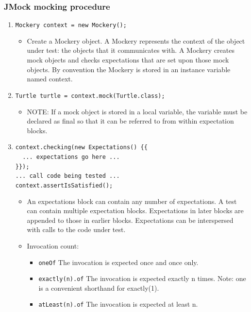 \documentclass{article}
\begin{document}
\subsubsection{JMock mocking procedure}
\begin{enumerate}
    \item \lstinline{Mockery context = new Mockery();}
        \begin{itemize}
            \item Create a Mockery object. A Mockery represents the context of the object under test: the objects that it communicates with. A Mockery creates mock objects and checks expectations that are set upon those mock objects. By convention the Mockery is stored in an instance variable named context.
        \end{itemize}
    \item \lstinline{Turtle turtle = context.mock(Turtle.class);}
        \begin{itemize}
            \item NOTE: If a mock object is stored in a local variable, the variable must be declared as final so that it can be referred to from within expectation blocks.
        \end{itemize}
    \item \lstinline|context.checking(new Expectations() {{|\\
          \lstinline|  ... expectations go here ...|\\
          \lstinline|}});|\\
          \lstinline|... call code being tested ...|\\
          \lstinline|context.assertIsSatisfied();|
        \begin{itemize}
            \item An expectations block can contain any number of expectations. A test can contain multiple expectation blocks. Expectations in later blocks are appended to those in earlier blocks. Expectations can be interspersed with calls to the code under test.
            \item Invocation count:
            \begin{itemize}
                \item \lstinline{oneOf}	The invocation is expected once and once only.
                \item \lstinline{exactly(n).of}	The invocation is expected exactly n times. Note: one is a convenient shorthand for exactly(1).
                \item \lstinline{atLeast(n).of}	The invocation is expected at least n.

\end{itemize}
\end{itemize}
\end{enumerate}
\end{document}
